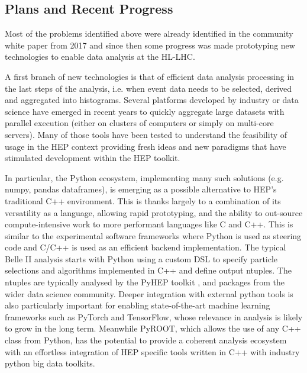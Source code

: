 \documentclass[11pt,a4paper]{article}
\begin{document}
\hypertarget{plans-and-recent-progress}{%
\subsection{Plans and Recent Progress}\label{plans-and-recent-progress}}

Most of the problems identified above were already identified in the
community white paper \cite{Ref17} from 2017 and since then some progress
was made prototyping new technologies to enable data analysis at the
HL-LHC.

A first branch of new technologies is that of efficient data analysis
processing in the last steps of the analysis, i.e. when event data needs
to be selected, derived and aggregated into histograms. Several
platforms developed by industry or data science have emerged in recent
years to quickly aggregate large datasets with parallel execution
(either on clusters of computers or simply on multi-core servers). Many
of those tools have been tested to understand the feasibility of usage
in the HEP context providing fresh ideas and new paradigms that have
stimulated development within the HEP toolkit.

In particular, the Python ecosystem, implementing many such solutions
(e.g. numpy, pandas dataframes), is emerging as a possible alternative
to HEP's traditional C++ environment. This is thanks largely to a
combination of its versatility as a language, allowing rapid
prototyping, and the ability to out-source compute-intensive work to
more performant languages like C and C++. This is similar to the
experimental software frameworks where Python is used as steering code
and C/C++ is used as an efficient backend implementation. The typical
Belle II analysis starts with Python using a custom DSL to specify
particle selections and algorithms implemented in C++ and define output
ntuples. The ntuples are typically analysed by the PyHEP toolkit
\cite{Ref6}, and packages from the wider data science community. Deeper
integration with external python tools is also particularly important
for enabling state-of-the-art machine learning frameworks such as
PyTorch and TensorFlow, whose relevance in analysis is likely to grow in
the long term. Meanwhile PyROOT, which allows the use of any C++ class
from Python, has the potential to provide a coherent analysis ecosystem
with an effortless integration of HEP specific tools written in C++ with
industry python big data toolkits.
\end{document}
